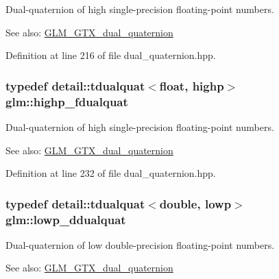 Dual-quaternion of high single-precision floating-point numbers.

\begin{Desc}
\item[See also:]\hyperlink{group__gtc__dual__quaternion}{GLM\_\-GTX\_\-dual\_\-quaternion} \end{Desc}


Definition at line 216 of file dual\_\-quaternion.hpp.\hypertarget{group__gtc__dual__quaternion_g2ed3283c09d3ffaf52a0e0a4b248eab6}{
\subsubsection[highp\_\-fdualquat]{\setlength{\rightskip}{0pt plus 5cm}typedef detail::tdualquat$<$float, highp$>$ {\bf glm::highp\_\-fdualquat}}}
\label{group__gtc__dual__quaternion_g2ed3283c09d3ffaf52a0e0a4b248eab6}


Dual-quaternion of high single-precision floating-point numbers.

\begin{Desc}
\item[See also:]\hyperlink{group__gtc__dual__quaternion}{GLM\_\-GTX\_\-dual\_\-quaternion} \end{Desc}


Definition at line 232 of file dual\_\-quaternion.hpp.\hypertarget{group__gtc__dual__quaternion_g29461fddd543ffdf65a199fc28c42458}{
\subsubsection[lowp\_\-ddualquat]{\setlength{\rightskip}{0pt plus 5cm}typedef detail::tdualquat$<$double, lowp$>$ {\bf glm::lowp\_\-ddualquat}}}
\label{group__gtc__dual__quaternion_g29461fddd543ffdf65a199fc28c42458}


Dual-quaternion of low double-precision floating-point numbers.

\begin{Desc}
\item[See also:]\hyperlink{group__gtc__dual__quaternion}{GLM\_\-GTX\_\-dual\_\-quaternion} \end{Desc}


